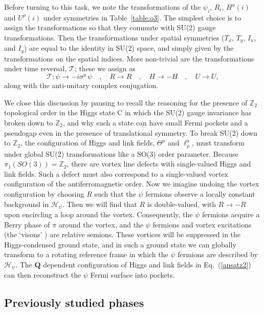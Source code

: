 \documentclass[aps,prb,preprint,onecolumn,citeautoscript,superscriptaddress,footinbib,
eqsecnum]{revtex4-1}
\begin{document}
Before turning to this task, we note the transformations of the $\psi_i$, $R_i$, $H^a (i)$ and $U^\rho (i)$
under symmetries in Table~\ref{table:o3}. The simplest choice is to 
assign the transformations 
so that they commute with SU(2) gauge transformations. Then the transformations under spatial
symmetries ($T_x$, $T_y$, $I_x$, and $I_y$) are equal to the identity in SU(2) space, 
and simply given by the transformations on the spatial indices. More non-trivial are the 
transformations under time reversal, $\mathcal{T}$; these we assign as
\begin{equation}
\mathcal{T}: \psi \rightarrow - i \sigma^y \, \psi \quad,\quad R \rightarrow R \quad , \quad
H \rightarrow - H \quad, \quad U \rightarrow U,
\label{timesu2}
\end{equation}
along with the anti-unitary complex conjugation.

We close this discussion by pausing to recall 
the reasoning \cite{1994PhRvL..72.2089C,2003RvMP...75..913S,2016PhRvB..94k5147S} for the presence of 
$\mathbb{Z}_2$ topological order in the Higgs state C in which the SU(2) gauge invariance has broken down to $\mathbb{Z}_2$, and
why such a state can have small Fermi pockets and a pseudogap even in the presence of translational symmetry.
To break SU(2) down to $\mathbb{Z}_2$, the configuration
of Higgs and link fields, $\Theta^a$ and $\ell_\rho^a$, must
transform under global SU(2) transformations like a SO(3) order parameter. Because $\pi_1 (SO(3)) = \mathbb{Z}_2$,
there are vortex line defects with single-valued Higgs 
and link fields. Such a defect must also correspond to a single-valued vortex configuration of the antiferromagnetic order. Now we imagine undoing
the vortex configuration by choosing
$R$ such that the $\psi$ fermions observe a locally constant background
in $\mathcal{H}_\psi$. Then we will find that $R$ is double-valued, with $R \rightarrow - R$ upon
encircling a loop around the vortex. Consequently, the $\psi$ fermions acquire a Berry phase of $\pi$ around the vortex, and the $\psi$ fermions and vortex excitations (the `visons' \cite{SenthilFisher}) are relative semions. 
These vortices will be suppressed in the Higgs-condensed ground state, 
and in such a ground state we can globally transform to a rotating reference frame in which
the $\psi$ fermions are described by $\mathcal{H}_\psi$. The ${\bm Q}$ dependent configuration of Higgs and link fields in Eq.~(\ref{ansatz2})
can then reconstruct the $\psi$ Fermi surface into pockets.

\subsection{Previously studied phases}
\label{sec:previous}
\end{document}
